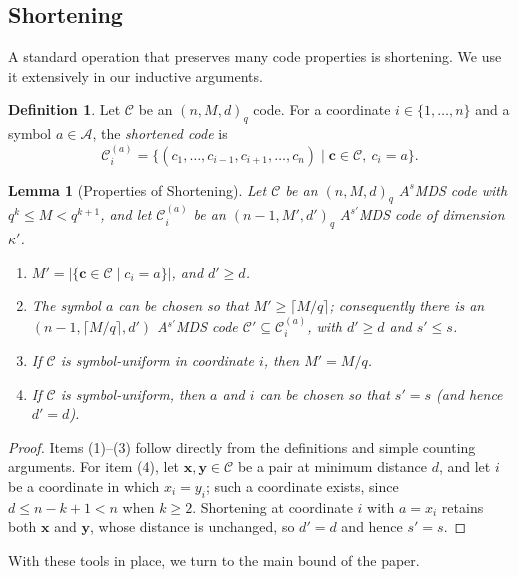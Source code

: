\documentclass[12pt, letterpaper]{article}
\theoremstyle{plain}
\newtheorem{lemma}[theorem]{Lemma}
\theoremstyle{definition}
\newtheorem{definition}[theorem]{Definition}
\newcommand{\A}{{\mathcal{A}}}
\newcommand{\mc}[1]{\mathcal{#1}}
\begin{document}
	\subsection{Shortening}
	
	A standard operation that preserves many code properties is shortening. We 	use it extensively in our inductive arguments.
	
	\begin{definition}
		Let $\mathcal{C}$ be an $(n, M, d)_q$ code. For a coordinate $i \in \{1, \dots, n\}$ and a symbol $a \in \A$, the \emph{shortened code} is
		\[
		\mathcal{C}_i^{(a)} = \bigl\{ (c_1, \dots, c_{i-1}, c_{i+1}, \dots, c_n) \mid \mathbf{c} \in \mathcal{C},\ c_i = a \bigr\}.
		\]
	\end{definition}
	\begin{lemma}[Properties of Shortening]\label{lem:shortening}
		Let $\mathcal{C}$ be an $(n, M, d)_q$ $A^s$MDS code with $q^k \le M < q^{k+1}$, and let $\mathcal{C}_i^{(a)}$ be an $(n-1, M', d')_q$ $A^{s'}$MDS code of dimension $\kappa'$.
		\begin{enumerate}
			\item $M' = |\{ \mathbf{c} \in \mathcal{C} \mid c_i = a \}|$, and $d' \ge d$.
			\item The symbol $a$ can be chosen so that 	$M' \ge \lceil M/q \rceil$; consequently there is an $(n-1,\lceil M/q \rceil,d')$ A$^{s'}$MDS code $\mc{C}'\subseteq \mc{C}_i^{(a)}$, with $d'\ge d$ and  $s' \le s$.
			\label{item:shortening_size}
			\item If $\mathcal{C}$ is symbol-uniform in coordinate $i$, then $M' = M/q$.
			\item If $\mathcal{C}$ is symbol-uniform, then $a$ and $i$ can be chosen so that $s' = s$ (and hence $d' = d$).
		\end{enumerate}
	\end{lemma}

	\begin{proof}
		Items (1)--(3) follow directly from the definitions and simple counting arguments. For item (4), let $\mathbf{x}, \mathbf{y} \in \mathcal{C}$ be a pair at minimum distance $d$, and let $i$ be a coordinate in which $x_i = y_i$; such a coordinate exists, since $d \le n - k + 1 < n$ when $k \ge 2$. Shortening at coordinate $i$ with $a = x_i$ retains both $\mathbf{x}$ and $\mathbf{y}$, whose distance is unchanged, so $d' = d$ and hence $s' = s$.
	\end{proof}
	
	With these tools in place, we turn to the main bound of the paper.
	
\end{document}
